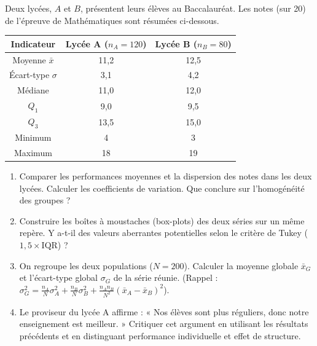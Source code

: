 \documentclass[11pt]{article}
\begin{document}
\begin{exercice}
Deux lycées, $A$ et $B$, présentent leurs élèves au Baccalauréat. Les notes (sur 20) de l'épreuve de Mathématiques sont résumées ci-dessous.
\begin{center}
\begin{tabular}{|c|c|c|}
\hline
Indicateur & Lycée A ($n_A=120$) & Lycée B ($n_B=80$) \\
\hline
Moyenne $\bar{x}$ & 11,2 & 12,5 \\
\hline
Écart-type $\sigma$ & 3,1 & 4,2 \\
\hline
Médiane & 11,0 & 12,0 \\
\hline
$Q_1$ & 9,0 & 9,5 \\
\hline
$Q_3$ & 13,5 & 15,0 \\
\hline
Minimum & 4 & 3 \\
\hline
Maximum & 18 & 19 \\
\hline
\end{tabular}
\end{center}
\begin{enumerate}
    \item Comparer les performances moyennes et la dispersion des notes dans les deux lycées. Calculer les coefficients de variation. Que conclure sur l'homogénéité des groupes ?
    \item Construire les boîtes à moustaches (box-plots) des deux séries sur un même repère. Y a-t-il des valeurs aberrantes potentielles selon le critère de Tukey ($1,5 \times \text{IQR}$) ?
    \item On regroupe les deux populations ($N=200$). Calculer la moyenne globale $\bar{x}_G$ et l'écart-type global $\sigma_G$ de la série réunie. (Rappel : $\sigma_G^2 = \frac{n_A}{N}\sigma_A^2 + \frac{n_B}{N}\sigma_B^2 + \frac{n_A n_B}{N^2}(\bar{x}_A - \bar{x}_B)^2$).
    \item Le proviseur du lycée A affirme : « Nos élèves sont plus réguliers, donc notre enseignement est meilleur. » Critiquer cet argument en utilisant les résultats précédents et en distinguant performance individuelle et effet de structure.
\end{enumerate}
\end{exercice}
\end{document}
